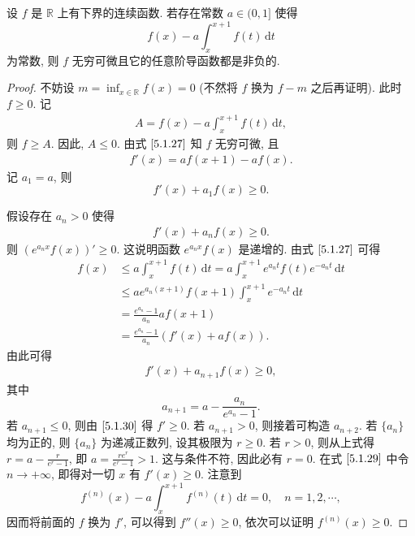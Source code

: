 \documentclass[../../main.tex]{subfiles}
\begin{document}
\begin{example}
设 \( f \) 是 \( \mathbb{R} \) 上有下界的连续函数. 若存在常数 \( a \in (0,1] \) 使得  
\[
f(x) - a \int_{x}^{x + 1} f(t) \, \mathrm{d}t
\]  
为常数, 则 \( f \) 无穷可微且它的任意阶导函数都是非负的.  
\end{example}
\begin{proof}
不妨设 \( m = \inf_{x \in \mathbb{R}} f(x) = 0 \) (不然将 \( f \) 换为 \( f - m \) 之后再证明). 此时 \( f \geq 0 \). 记  
\begin{align}
A = f(x) - a \int_{x}^{x + 1} f(t) \, \mathrm{d}t, \label{5.1.27}
\end{align}
则 \( f \geq A \). 因此, \( A \leq 0 \). 由式 \(\eqref{5.1.27}\) 知 \( f \) 无穷可微, 且  
\begin{align}
f'(x) = a f(x + 1) - a f(x). \label{5.1.28}
\end{align}  
记 \( a_1 = a \), 则  
\[
f'(x) + a_1 f(x) \geq 0.
\]  

假设存在 \( a_n > 0 \) 使得  
\begin{align}
f'(x) + a_n f(x) \geq 0. \label{5.1.29}
\end{align}  
则 \( (e^{a_n x} f(x))' \geq 0 \). 这说明函数 \( e^{a_n x} f(x) \) 是递增的. 由式 \(\eqref{5.1.27}\) 可得  
\[
\begin{aligned}
f(x) &\leq a \int_{x}^{x + 1} f(t) \, \mathrm{d}t = a \int_{x}^{x + 1} e^{a_n t} f(t) e^{-a_n t} \, \mathrm{d}t \\
&\leq a e^{a_n (x + 1)} f(x + 1) \int_{x}^{x + 1} e^{-a_n t} \, \mathrm{d}t \\
&= \frac{e^{a_n} - 1}{a_n} a f(x + 1) \\
&= \frac{e^{a_n} - 1}{a_n} (f'(x) + a f(x)).
\end{aligned}
\]  
由此可得  
\begin{align}
f'(x) + a_{n + 1} f(x) \geq 0, \label{5.1.30}
\end{align}  
其中  
\[
a_{n + 1} = a - \frac{a_n}{e^{a_n} - 1}.
\]  
若 \( a_{n + 1} \leq 0 \), 则由 \(\eqref{5.1.30}\) 得 \( f' \geq 0 \). 若 \( a_{n + 1} > 0 \), 则接着可构造 \( a_{n + 2} \). 若 \( \{a_n\} \) 均为正的, 则 \( \{a_n\} \) 为递减正数列, 设其极限为 \( r \geq 0 \). 若 \( r > 0 \), 则从上式得 \( r = a - \frac{r}{e^r - 1} \), 即 \( a = \frac{r e^r}{e^r - 1} > 1 \). 这与条件不符, 因此必有 \( r = 0 \). 在式 \(\eqref{5.1.29}\) 中令 \( n \to +\infty \), 即得对一切 \( x \) 有 \( f'(x) \geq 0 \). 注意到  
\[
f^{(n)}(x) - a \int_{x}^{x + 1} f^{(n)}(t) \, \mathrm{d}t = 0, \quad n = 1, 2, \cdots,
\]  
因而将前面的 \( f \) 换为 \( f' \), 可以得到 \( f''(x) \geq 0 \), 依次可以证明 \( f^{(n)}(x) \geq 0 \).

\end{proof}
\end{document}

